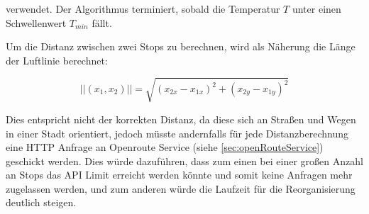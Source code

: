 		verwendet. Der Algorithmus terminiert, sobald die Temperatur $T$ unter einen Schwellenwert $T_{min}$ fällt. 
	
		Um die Distanz zwischen zwei Stops zu berechnen, wird als Näherung die Länge der Luftlinie berechnet: 
		
		\begin{equation}
			||(x_1, x_2)|| = \sqrt{ ( x_{2x} - x_{1x} )^2  + ( x_{2y} - x_{1y} )^2 }
		\end{equation}
		
		Dies entspricht nicht der korrekten Distanz, da diese sich an Straßen und Wegen in einer Stadt orientiert, jedoch müsste andernfalls für jede Distanzberechnung eine \acs{HTTP} Anfrage an Openroute Service (siehe \autoref{sec:openRouteService}) geschickt werden. Dies würde dazuführen, dass zum einen bei einer großen Anzahl an Stops das API Limit erreicht werden könnte und somit keine Anfragen mehr zugelassen werden, und zum anderen würde die Laufzeit für die Reorganisierung deutlich steigen.
		 